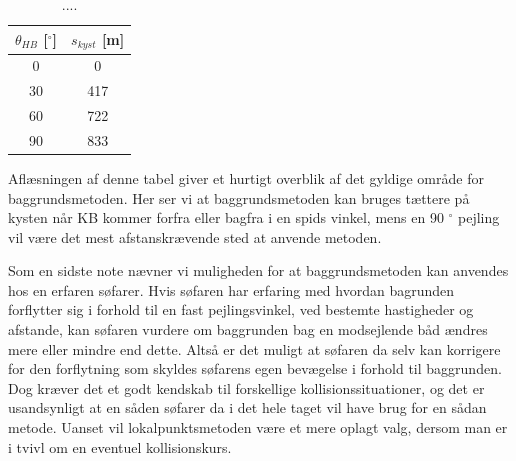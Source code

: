 \documentclass[%
 reprint,
nofootinbib,
aps,
]{revtex4-1}
\begin{document}
\begin{table}[H]
 \begin{center}
 \caption{....}
 \begin{tabular}{|c|c|} \hline
 $\theta_{HB}$ [$^{\circ}$] & $s_{kyst}$ [m]  \\ \hline
 0 & 0 \\ \hline
 30 & 417 \\ \hline
 60 & 722  \\ \hline
 90 & 833 \\ \hline
 \end{tabular}
 \end{center}
 \label{tab:valid_area}
\end{table}
Aflæsningen af denne tabel giver et hurtigt overblik af det gyldige område for baggrundsmetoden. Her ser vi at baggrundsmetoden kan bruges tættere på kysten når KB kommer forfra eller bagfra i en spids vinkel, mens en 90 $^{\circ}$ pejling vil være det mest afstanskrævende sted at anvende metoden. \par
Som en sidste note nævner vi muligheden for at baggrundsmetoden kan anvendes hos en erfaren søfarer. Hvis søfaren har erfaring med hvordan bagrunden forflytter sig i forhold til en fast pejlingsvinkel, ved bestemte hastigheder og afstande, kan søfaren vurdere om baggrunden bag en modsejlende båd ændres mere eller mindre end dette. Altså er det muligt at søfaren da selv kan korrigere for den forflytning som skyldes søfarens egen bevægelse i forhold til baggrunden. Dog kræver det et godt kendskab til forskellige kollisionssituationer, og det er usandsynligt at en såden søfarer da i det hele taget vil have brug for en sådan metode. Uanset vil lokalpunktsmetoden være et mere oplagt valg, dersom man er i tvivl om en eventuel kollisionskurs.
\linebreak


\newpage
\end{document}
